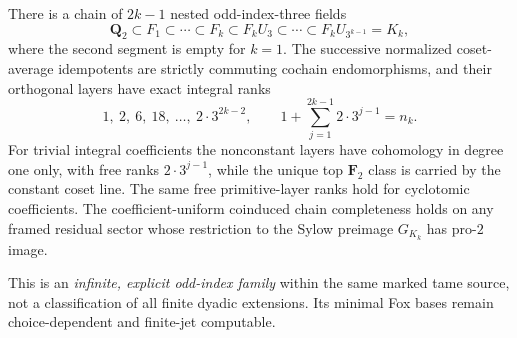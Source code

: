 \begin{theorem}
There is a
chain of
$2k-1$ nested
odd-index-three
fields
\begin{equation}\label{eq:dyadic-f135-uniform-field-chain}
\mathbf Q_2
\subset F_1\subset\cdots\subset F_k
\subset F_kU_3\subset\cdots
\subset F_kU_{3^{k-1}}=K_k,
\end{equation}
where the
second segment
is empty for
$k=1$.
The successive
normalized
coset-average
idempotents
are strictly
commuting cochain
endomorphisms,
and their
orthogonal layers
have exact
integral ranks
\begin{equation}\label{eq:dyadic-f135-uniform-hecke-ranks}
\boxed{\qquad
1,\ 2,\ 6,\ 18,\ \ldots,\
2\cdot3^{2k-2},
\qquad
1+\sum_{j=1}^{2k-1}
2\cdot3^{j-1}
=n_k.
\qquad}
\end{equation}
For trivial
integral coefficients
the nonconstant
layers have
cohomology in
degree one only,
with free ranks
$2\cdot3^{j-1}$,
while the unique
top $\mathbf F_2$
class is carried
by the constant
coset line.
The same free
primitive-layer
ranks hold for
cyclotomic coefficients.
The coefficient-uniform
coinduced
chain completeness
holds on any
framed residual
sector whose
restriction to
the Sylow
preimage $G_{K_k}$
has pro-$2$ image.

This is an
\emph{infinite,
explicit odd-index
family} within
the same marked
tame source,
not a
classification
of all finite
dyadic extensions.
Its minimal
Fox bases remain
choice-dependent
and finite-jet
computable.
\end{theorem}


